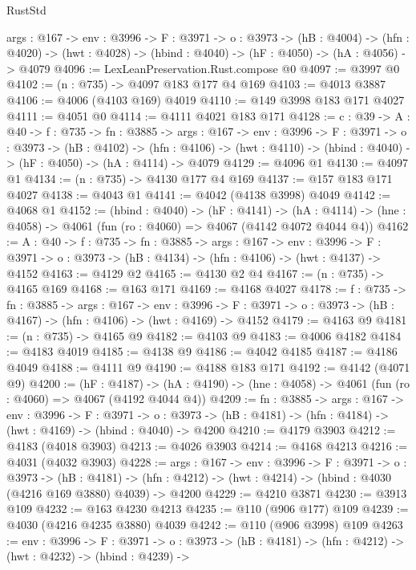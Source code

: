 \begin{lexlean}{RustStd}
\begin{coremodule}
  {args : @167} ->
  {env : @3996} ->
  {F : @3971} ->
  {o : @3973} ->
  (hB : @4004) ->
  (hfn : @4020) -> (hwt : @4028) -> (hbind : @4040) -> (hF : @4050) -> (hA : @4056) -> @4079
@4096 := LexLeanPreservation.Rust.compose @0
@4097 := @3997 @0
@4102 := (n : @735) -> @4097 @183 @177 @4 @169
@4103 := @4013 @3887
@4106 := @4006 (@4103 @169) @4019
@4110 := @149 @3998 @183 @171 @4027
@4111 := @4051 @0
@4114 := @4111 @4021 @183 @171
@4128 := {c : @39} ->
  {A : @40} ->
  {f : @735} ->
  {fn : @3885} ->
  {args : @167} ->
  {env : @3996} ->
  {F : @3971} ->
  {o : @3973} ->
  (hB : @4102) ->
  (hfn : @4106) -> (hwt : @4110) -> (hbind : @4040) -> (hF : @4050) -> (hA : @4114) -> @4079
@4129 := @4096 @1
@4130 := @4097 @1
@4134 := (n : @735) -> @4130 @177 @4 @169
@4137 := @157 @183 @171 @4027
@4138 := @4043 @1
@4141 := @4042 (@4138 @3998) @4049
@4142 := @4068 @1
@4152 := (hbind : @4040) ->
  (hF : @4141) ->
  (hA : @4114) -> (hne : @4058) -> @4061 (fun (ro : @4060) => @4067 (@4142 @4072 @4044 @4))
@4162 := {A : @40} ->
  {f : @735} ->
  {fn : @3885} ->
  {args : @167} ->
  {env : @3996} ->
  {F : @3971} -> {o : @3973} -> (hB : @4134) -> (hfn : @4106) -> (hwt : @4137) -> @4152
@4163 := @4129 @2
@4165 := @4130 @2 @4
@4167 := (n : @735) -> @4165 @169
@4168 := @163 @171
@4169 := @4168 @4027
@4178 := {f : @735} ->
  {fn : @3885} ->
  {args : @167} ->
  {env : @3996} ->
  {F : @3971} -> {o : @3973} -> (hB : @4167) -> (hfn : @4106) -> (hwt : @4169) -> @4152
@4179 := @4163 @9
@4181 := (n : @735) -> @4165 @9
@4182 := @4103 @9
@4183 := @4006 @4182
@4184 := @4183 @4019
@4185 := @4138 @9
@4186 := @4042 @4185
@4187 := @4186 @4049
@4188 := @4111 @9
@4190 := @4188 @183 @171
@4192 := @4142 (@4071 @9)
@4200 := (hF : @4187) ->
  (hA : @4190) -> (hne : @4058) -> @4061 (fun (ro : @4060) => @4067 (@4192 @4044 @4))
@4209 := {fn : @3885} ->
  {args : @167} ->
  {env : @3996} ->
  {F : @3971} ->
  {o : @3973} -> (hB : @4181) -> (hfn : @4184) -> (hwt : @4169) -> (hbind : @4040) -> @4200
@4210 := @4179 @3903
@4212 := @4183 (@4018 @3903)
@4213 := @4026 @3903
@4214 := @4168 @4213
@4216 := @4031 (@4032 @3903)
@4228 := {args : @167} ->
  {env : @3996} ->
  {F : @3971} ->
  {o : @3973} ->
  (hB : @4181) ->
  (hfn : @4212) -> (hwt : @4214) -> (hbind : @4030 (@4216 @169 @3880) @4039) -> @4200
@4229 := @4210 @3871
@4230 := @3913 @109
@4232 := @163 @4230 @4213
@4235 := @110 (@906 @177) @109
@4239 := @4030 (@4216 @4235 @3880) @4039
@4242 := @110 (@906 @3998) @109
@4263 := {env : @3996} ->
  {F : @3971} ->
  {o : @3973} ->
  (hB : @4181) ->
  (hfn : @4212) ->
  (hwt : @4232) ->
  (hbind : @4239) ->

\end{coremodule}
\end{lexlean}
